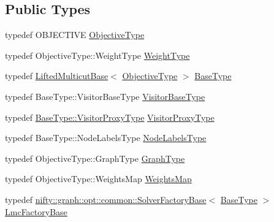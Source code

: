 \subsection*{Public Types}
\begin{DoxyCompactItemize}
\item 
typedef O\+B\+J\+E\+C\+T\+I\+VE \hyperlink{classnifty_1_1graph_1_1opt_1_1lifted__multicut_1_1ChainedSolvers_a59b16a41f7cc3aa24888584899f118e8}{Objective\+Type}
\item 
typedef Objective\+Type\+::\+Weight\+Type \hyperlink{classnifty_1_1graph_1_1opt_1_1lifted__multicut_1_1ChainedSolvers_a912144b4e8f9d1d4c6919ab8055c4e5c}{Weight\+Type}
\item 
typedef \hyperlink{classnifty_1_1graph_1_1opt_1_1lifted__multicut_1_1LiftedMulticutBase}{Lifted\+Multicut\+Base}$<$ \hyperlink{classnifty_1_1graph_1_1opt_1_1lifted__multicut_1_1ChainedSolvers_a59b16a41f7cc3aa24888584899f118e8}{Objective\+Type} $>$ \hyperlink{classnifty_1_1graph_1_1opt_1_1lifted__multicut_1_1ChainedSolvers_a8d7bda129d1f1afb9dca81ff513dca09}{Base\+Type}
\item 
typedef Base\+Type\+::\+Visitor\+Base\+Type \hyperlink{classnifty_1_1graph_1_1opt_1_1lifted__multicut_1_1ChainedSolvers_ac33a800e2d3542a35679d01a334e1751}{Visitor\+Base\+Type}
\item 
typedef \hyperlink{classnifty_1_1graph_1_1opt_1_1common_1_1SolverBase_ad209b469b3bc9fc0fc14e9fed4d09075}{Base\+Type\+::\+Visitor\+Proxy\+Type} \hyperlink{classnifty_1_1graph_1_1opt_1_1lifted__multicut_1_1ChainedSolvers_ae5ecbe72a3e03999eb316cc0e70e5e6d}{Visitor\+Proxy\+Type}
\item 
typedef Base\+Type\+::\+Node\+Labels\+Type \hyperlink{classnifty_1_1graph_1_1opt_1_1lifted__multicut_1_1ChainedSolvers_a8c2130c9b1a596d14098018c54b8f976}{Node\+Labels\+Type}
\item 
typedef Objective\+Type\+::\+Graph\+Type \hyperlink{classnifty_1_1graph_1_1opt_1_1lifted__multicut_1_1ChainedSolvers_a64de588b4974fbbf88c56a0e172fcc94}{Graph\+Type}
\item 
typedef Objective\+Type\+::\+Weights\+Map \hyperlink{classnifty_1_1graph_1_1opt_1_1lifted__multicut_1_1ChainedSolvers_a0d2c7fee00b27707b157f2cde2be12fb}{Weights\+Map}
\item 
typedef \hyperlink{classnifty_1_1graph_1_1opt_1_1common_1_1SolverFactoryBase}{nifty\+::graph\+::opt\+::common\+::\+Solver\+Factory\+Base}$<$ \hyperlink{classnifty_1_1graph_1_1opt_1_1lifted__multicut_1_1ChainedSolvers_a8d7bda129d1f1afb9dca81ff513dca09}{Base\+Type} $>$ \hyperlink{classnifty_1_1graph_1_1opt_1_1lifted__multicut_1_1ChainedSolvers_a2fcd33b5ef677b2f9a74d3e1eb8370f3}{Lmc\+Factory\+Base}
\end{DoxyCompactItemize}
